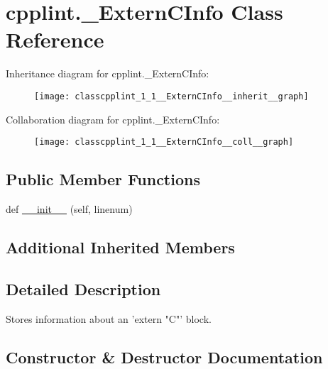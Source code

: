 \hypertarget{classcpplint_1_1__ExternCInfo}{}\section{cpplint.\+\_\+\+Extern\+C\+Info Class Reference}
\label{classcpplint_1_1__ExternCInfo}


Inheritance diagram for cpplint.\+\_\+\+Extern\+C\+Info\+:\nopagebreak
\begin{figure}[H]
\begin{center}
\leavevmode
\texttt{[image: classcpplint\_1\_1\_\_ExternCInfo\_\_inherit\_\_graph]}
\end{center}
\end{figure}


Collaboration diagram for cpplint.\+\_\+\+Extern\+C\+Info\+:\nopagebreak
\begin{figure}[H]
\begin{center}
\leavevmode
\texttt{[image: classcpplint\_1\_1\_\_ExternCInfo\_\_coll\_\_graph]}
\end{center}
\end{figure}
\subsection*{Public Member Functions}
\begin{DoxyCompactItemize}
\item 
def \hyperlink{classcpplint_1_1__ExternCInfo_a903a8aefdb01fd5be044f920ea110d0a}{\+\_\+\+\_\+init\+\_\+\+\_\+} (self, linenum)
\end{DoxyCompactItemize}
\subsection*{Additional Inherited Members}


\subsection{Detailed Description}
\begin{DoxyVerb}Stores information about an 'extern "C"' block.\end{DoxyVerb}
 

\subsection{Constructor \& Destructor Documentation}
